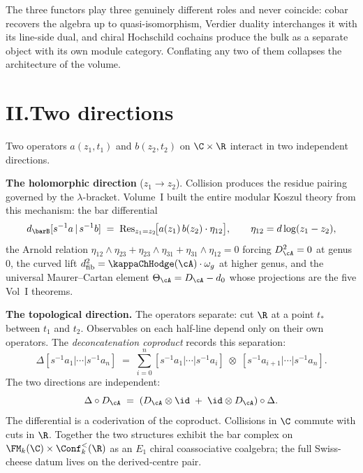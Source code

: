 The three functors play three genuinely different roles and never
coincide: cobar recovers the algebra up to quasi-isomorphism,
Verdier duality interchanges it with its line-side dual, and
chiral Hochschild cochains produce the bulk as a separate object
with its own module category. Conflating any two of them
collapses the architecture of the volume.

\section*{II.\quad Two directions}

Two operators $a(z_1, t_1)$ and $b(z_2, t_2)$ on $\C \times \R$
interact in two independent directions.

\smallskip
\noindent\textbf{The holomorphic direction} ($z_1 \to z_2$).
Collision produces the residue pairing governed by the
$\lambda$-bracket. Volume~I built the entire modular Koszul
theory from this mechanism: the bar differential
\[
d_{\barB}[s^{-1}a \,|\, s^{-1}b]
\;=\;
\Res_{z_1 = z_2}\!\bigl[
 a(z_1)\,b(z_2)\cdot\eta_{12}
\bigr],
\qquad
\eta_{12} = d\log(z_1 - z_2),
\]
the Arnold relation
$\eta_{12}\wedge\eta_{23} + \eta_{23}\wedge\eta_{31}
+ \eta_{31}\wedge\eta_{12} = 0$
forcing $D_\cA^2 = 0$ at genus~$0$, the curved lift
$d_{\mathrm{fib}}^2 = \kappaChHodge(\cA) \cdot \omega_g$ at higher genus,
and the universal Maurer--Cartan element
$\Theta_\cA = D_\cA - d_0$ whose projections are the five Vol~I
theorems.

\smallskip
\noindent\textbf{The topological direction.}
The operators separate: cut $\R$ at a point $t_*$ between $t_1$
and $t_2$. Observables on each half-line depend only on their
own operators. The \emph{deconcatenation coproduct} records this
separation:
\begin{equation}\label{eq:preface2-delta}
\Delta[s^{-1}a_1|\cdots|s^{-1}a_n]
\;=\;
\sum_{i=0}^{n}
[s^{-1}a_1|\cdots|s^{-1}a_i]
\;\otimes\;
[s^{-1}a_{i+1}|\cdots|s^{-1}a_n].
\end{equation}
The two directions are independent:
\begin{equation}\label{eq:preface2-coderivation}
\Delta \circ D_\cA
\;=\;
(D_\cA \otimes \id \;+\; \id \otimes D_\cA) \circ \Delta.
\end{equation}
The differential is a coderivation of the coproduct. Collisions
in $\C$ commute with cuts in $\R$. Together the two structures
exhibit the bar complex on
$\FM_k(\C) \times \Conf_k^{<}(\R)$ as an $E_1$ chiral
coassociative coalgebra; the full Swiss-cheese datum lives on the
derived-centre pair.

